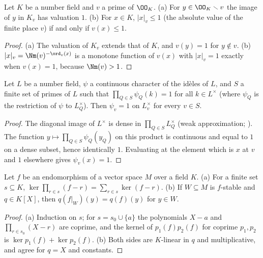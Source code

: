 \begin{lemma}\label{pf:baselat2:valone}
Let $K$ be a number field and $v$ a prime of $\OO_K$.
\textup{(a)} For $y\in\OO_K\smallsetminus v$ the image of $y$ in $K_v$ has valuation $1$.
\textup{(b)} For $x\in K$, $|x|_v\le1$ (the absolute value of the finite place $v$) if and only if $v(x)\le1$.
\end{lemma}

\begin{proof}
(a) The valuation of $K_v$ extends that of $K$, and $v(y)=1$ for $y\notin v$. (b) $|x|_v=\Nm(v)^{-\ord_v(x)}$ is a
monotone function of $v(x)$ with $|x|_v=1$ exactly when $v(x)=1$, because $\Nm(v)>1$.
\end{proof}

\begin{lemma}\label{pf:baselat2:locone}
Let $L$ be a number field, $\psi$ a continuous character of the id\`eles of $L$, and $S$ a finite set of primes of
$L$ such that $\prod_{Q\in S}\psi_Q(k)=1$ for all $k\in L^\times$ (where $\psi_Q$ is the restriction of $\psi$ to
$L_Q^\times$). Then $\psi_v=1$ on $L_v^\times$ for every $v\in S$.
\end{lemma}

\begin{proof}
The diagonal image of $L^\times$ is dense in $\prod_{Q\in S}L_Q^\times$ (weak approximation;
). The function $y\mapsto\prod_{Q\in S}\psi_Q(y_Q)$ on this product is
continuous and equal to $1$ on a dense subset, hence identically $1$. Evaluating at the element which is $x$ at
$v$ and $1$ elsewhere gives $\psi_v(x)=1$.
\end{proof}

\begin{lemma}\label{pf:baselat2:jointdiag}
Let $f$ be an endomorphism of a vector space $M$ over a field $K$.
\textup{(a)} For a finite set $s\subseteq K$, $\ker\prod_{r\in s}(f-r)=\sum_{r\in s}\ker(f-r)$.
\textup{(b)} If $W\subseteq M$ is $f$-stable and $q\in K[X]$, then $q(f|_W)(y)=q(f)(y)$ for $y\in W$.
\end{lemma}

\begin{proof}
(a) Induction on $s$; for $s=s_0\cup\{a\}$ the polynomials $X-a$ and $\prod_{r\in s_0}(X-r)$ are coprime, and the kernel
of $p_1(f)p_2(f)$ for coprime $p_1,p_2$ is $\ker p_1(f)+\ker p_2(f)$. (b) Both sides are $K$-linear in $q$ and
multiplicative, and agree for $q=X$ and constants.
\end{proof}

